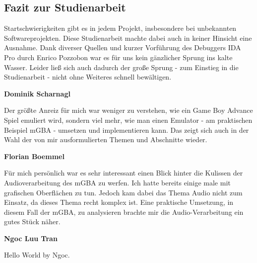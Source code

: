 \documentclass[11pt,a4paper]{scrartcl}
\newcommand{\paratitle}[1] {
    \vspace{5mm}
    \large \textbf{#1} \normalsize
    \vspace{2mm}\newline
}
\begin{document}
\subsection{Fazit zur Studienarbeit}
Startschwierigkeiten gibt es in jedem Projekt, insbesondere bei unbekannten Softwareprojekten. Diese Studienarbeit machte dabei auch in keiner Hinsicht eine Ausnahme. Dank diverser Quellen und kurzer Vorf\"uhrung des Debuggers IDA Pro durch Enrico Pozzobon war es f\"ur uns kein g\"anzlicher Sprung ins kalte Wasser. Leider lie{\ss} sich auch dadurch der gro{\ss}e Sprung - zum Einstieg in die Studienarbeit - nicht ohne Weiteres schnell bew\"altigen.

\paratitle{Dominik Scharnagl}
Der gr\"o{\ss}te Anreiz f\"ur mich war weniger zu verstehen, wie ein Game Boy Advance Spiel emuliert wird, sondern viel mehr, wie man einen Emulator - am praktischen Beispiel mGBA - umsetzen und implementieren kann. Das zeigt sich auch in der Wahl der von mir ausformulierten Themen und Abschnitte wieder.

\paratitle{Florian Boemmel}
F\"ur mich pers\"onlich war es sehr interessant einen Blick hinter die Kulissen der Audioverarbeitung des mGBA zu werfen. Ich hatte bereits einige male mit grafischen Oberfl\"achen zu tun. Jedoch kam dabei das Thema Audio nicht zum Einsatz, da dieses Thema recht komplex ist. Eine praktische Umsetzung, in diesem Fall der mGBA, zu analysieren brachte mir die Audio-Verarbeitung ein gutes St\"uck n\"aher. 

\paratitle{Ngoc Luu Tran}
Hello World by Ngoc.


\newpage
{}
\end{document}
